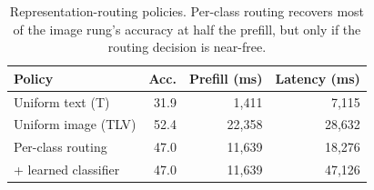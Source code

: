 \begin{table}[t]
\centering
\small
\setlength{\tabcolsep}{5pt}
\begin{tabular}{lrrr}
\toprule
\textbf{Policy} & \textbf{Acc.} & \textbf{Prefill (ms)} & \textbf{Latency (ms)} \\
\midrule
Uniform text (T)        & 31.9 & 1{,}411  & 7{,}115  \\
Uniform image (TLV)     & 52.4 & 22{,}358 & 28{,}632 \\
Per-class routing       & 47.0 & 11{,}639 & 18{,}276 \\
\quad + learned classifier & 47.0 & 11{,}639 & 47{,}126 \\
\bottomrule
\end{tabular}

\vspace{2pt}

\caption{Representation-routing policies. Per-class routing recovers most of the image rung's accuracy at half the prefill, but only if the routing decision is near-free.}
\label{tab:routing}
\end{table}